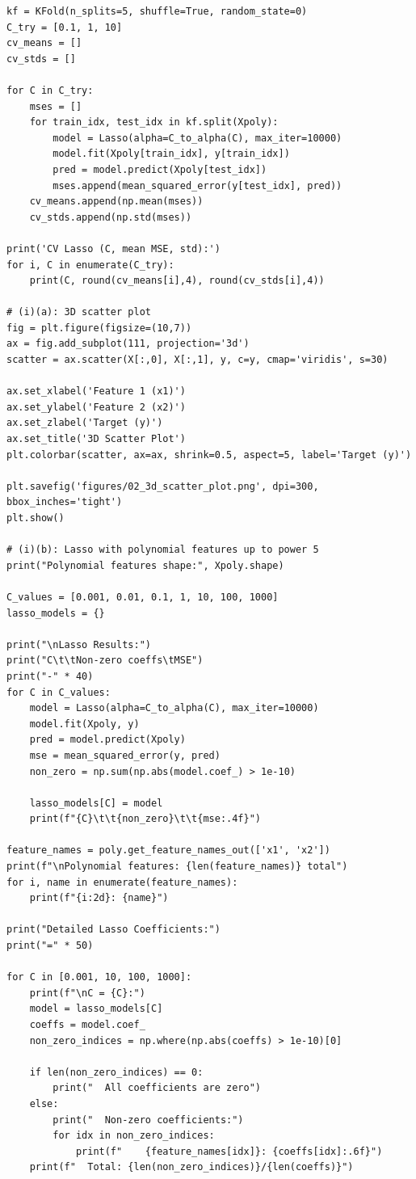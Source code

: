 \documentclass[11pt,a4paper]{article}
\begin{document}
\begin{lstlisting}
kf = KFold(n_splits=5, shuffle=True, random_state=0)
C_try = [0.1, 1, 10]
cv_means = []
cv_stds = []

for C in C_try:
    mses = []
    for train_idx, test_idx in kf.split(Xpoly):
        model = Lasso(alpha=C_to_alpha(C), max_iter=10000)
        model.fit(Xpoly[train_idx], y[train_idx])
        pred = model.predict(Xpoly[test_idx])
        mses.append(mean_squared_error(y[test_idx], pred))
    cv_means.append(np.mean(mses))
    cv_stds.append(np.std(mses))

print('CV Lasso (C, mean MSE, std):')
for i, C in enumerate(C_try):
    print(C, round(cv_means[i],4), round(cv_stds[i],4))

# (i)(a): 3D scatter plot
fig = plt.figure(figsize=(10,7))
ax = fig.add_subplot(111, projection='3d')
scatter = ax.scatter(X[:,0], X[:,1], y, c=y, cmap='viridis', s=30)

ax.set_xlabel('Feature 1 (x1)')
ax.set_ylabel('Feature 2 (x2)')
ax.set_zlabel('Target (y)')
ax.set_title('3D Scatter Plot')
plt.colorbar(scatter, ax=ax, shrink=0.5, aspect=5, label='Target (y)')

plt.savefig('figures/02_3d_scatter_plot.png', dpi=300, bbox_inches='tight')
plt.show()

# (i)(b): Lasso with polynomial features up to power 5
print("Polynomial features shape:", Xpoly.shape)

C_values = [0.001, 0.01, 0.1, 1, 10, 100, 1000]
lasso_models = {}

print("\nLasso Results:")
print("C\t\tNon-zero coeffs\tMSE")
print("-" * 40)
for C in C_values:
    model = Lasso(alpha=C_to_alpha(C), max_iter=10000)
    model.fit(Xpoly, y)    
    pred = model.predict(Xpoly)
    mse = mean_squared_error(y, pred)
    non_zero = np.sum(np.abs(model.coef_) > 1e-10)
    
    lasso_models[C] = model
    print(f"{C}\t\t{non_zero}\t\t{mse:.4f}")

feature_names = poly.get_feature_names_out(['x1', 'x2'])
print(f"\nPolynomial features: {len(feature_names)} total")
for i, name in enumerate(feature_names):
    print(f"{i:2d}: {name}")

print("Detailed Lasso Coefficients:")
print("=" * 50)

for C in [0.001, 10, 100, 1000]:
    print(f"\nC = {C}:")
    model = lasso_models[C]
    coeffs = model.coef_
    non_zero_indices = np.where(np.abs(coeffs) > 1e-10)[0]
    
    if len(non_zero_indices) == 0:
        print("  All coefficients are zero")
    else:
        print("  Non-zero coefficients:")
        for idx in non_zero_indices:
            print(f"    {feature_names[idx]}: {coeffs[idx]:.6f}")
    print(f"  Total: {len(non_zero_indices)}/{len(coeffs)}")


\end{lstlisting}
\end{document}
